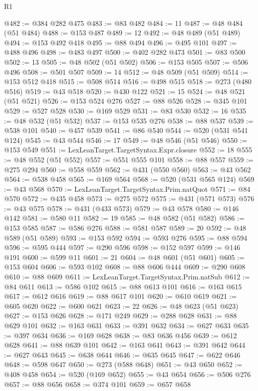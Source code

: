 \begin{lexlean}{R1}
\begin{coremodule}
@482 := @384 @282 @475
@483 := @83 @482
@484 := 11
@487 := @48 @484 (@51 @484)
@488 := @153 @487
@489 := 12
@492 := @48 @489 (@51 @489)
@494 := @153 @492 @418
@495 := @88 @494
@496 := @495 @101
@497 := @488 @496
@498 := @483 @497
@500 := @402 @282 @473
@501 := @83 @500
@502 := 13
@505 := @48 @502 (@51 @502)
@506 := @153 @505
@507 := @506 @496
@508 := @501 @507
@509 := 14
@512 := @48 @509 (@51 @509)
@514 := @153 @512 @418
@515 := @508 @514
@516 := @498 @515
@518 := @273 (@480 @516)
@519 := @43 @518
@520 := @430 @122
@521 := 15
@524 := @48 @521 (@51 @521)
@526 := @153 @524 @276
@527 := @88 @526
@528 := @345 @101
@529 := @527 @528
@530 := @169 @529
@531 := @83 @530
@532 := 16
@535 := @48 @532 (@51 @532)
@537 := @153 @535 @276
@538 := @88 @537
@539 := @538 @101
@540 := @457 @539
@541 := @86 @540
@544 := @520 (@531 @541 @124)
@545 := @43 @544
@546 := 17
@549 := @48 @546 (@51 @546)
@550 := @153 @549
@551 := LexLeanTarget.TargetSyntax.Expr.closure
@552 := 18
@555 := @48 @552 (@51 @552)
@557 := @551 @555 @101
@558 := @88 @557
@559 := @275 @294
@560 := @558 @559
@562 := @431 (@550 @560)
@563 := @43 @562
@564 := @538 @458
@565 := @169 @564
@568 := @520 (@531 @565 @124)
@569 := @43 @568
@570 := LexLeanTarget.TargetSyntax.Prim.natQuot
@571 := @84 @570
@572 := @435 @458
@573 := @275 @572
@575 := @431 (@571 @573)
@576 := @43 @575
@578 := @431 (@433 @573)
@579 := @43 @578
@580 := @146 @142
@581 := @580 @11
@582 := 19
@585 := @48 @582 (@51 @582)
@586 := @153 @585
@587 := @586 @276
@588 := @581 @587
@589 := 20
@592 := @48 @589 (@51 @589)
@593 := @153 @592
@594 := @593 @276
@595 := @88 @594
@596 := @595 @444
@597 := @290 @596
@598 := @152 @597
@599 := @146 @191
@600 := @599 @11
@601 := 21
@604 := @48 @601 (@51 @601)
@605 := @153 @604
@606 := @593 @102
@608 := @88 @606 @444
@609 := @290 @608
@610 := @88 @609
@611 := LexLeanTarget.TargetSyntax.Prim.natSub
@612 := @84 @611
@613 := @586 @102
@615 := @88 @613 @101
@616 := @163 @615
@617 := @612 @616
@619 := @88 @617 @101
@620 := @610 @619
@621 := @605 @620
@622 := @600 @621
@623 := 22
@626 := @48 @623 (@51 @623)
@627 := @153 @626
@628 := @171 @249
@629 := @288 @628
@631 := @88 @629 @101
@632 := @163 @631
@633 := @391 @632
@634 := @627 @633
@635 := @397 @634
@636 := @169 @628
@638 := @83 @636 @456
@639 := @612 @628
@641 := @88 @639 @101
@642 := @163 @641
@643 := @391 @642
@644 := @627 @643
@645 := @638 @644
@646 := @635 @645
@647 := @622 @646
@648 := @598 @647
@650 := @273 (@588 @648)
@651 := @43 @650
@652 := @408 @458
@654 := @520 (@169 @652)
@655 := @43 @654
@656 := @506 @276
@657 := @88 @656
@658 := @374 @101
@659 := @657 @658

\end{coremodule}
\end{lexlean}
